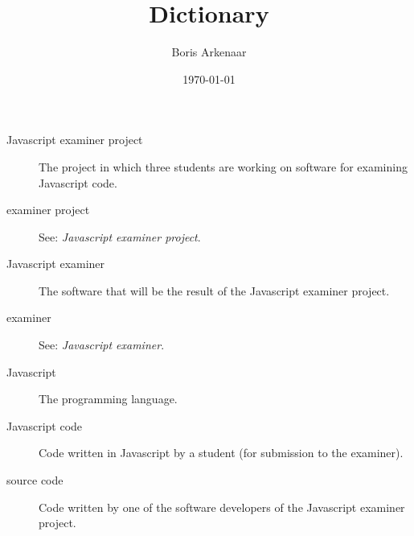 \documentclass{article}
\begin{document}
\title{Dictionary}
\author{Boris Arkenaar}
\date{\today}
\maketitle

\begin{description}
  \item[Javascript examiner project] The project in which three students are working on software for examining Javascript code.
  \item[examiner project] See: {\em Javascript examiner project}.
  \item[Javascript examiner] The software that will be the result of the Javascript examiner project.
  \item[examiner] See: {\em Javascript examiner}.
  \item[Javascript] The programming language.
  \item[Javascript code] Code written in Javascript by a student (for submission to the examiner).
  \item[source code] Code written by one of the software developers of the Javascript examiner project.
\end{description}
\end{document}
